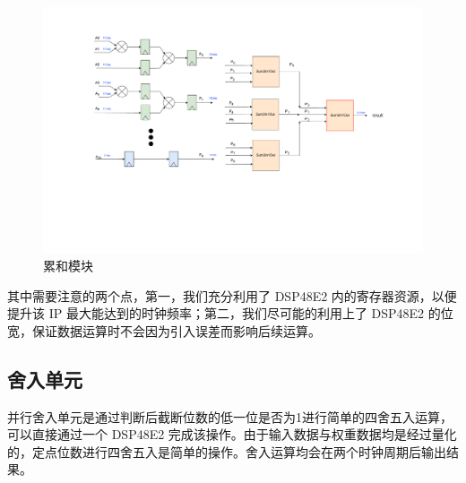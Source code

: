 \documentclass[12pt, a4paper, oneside]{ctexbook}
\begin{document}
		\begin{figure}[h]
		\centering
		\includegraphics[scale=0.52]{pic/sum}
		\caption{累和模块}
		\label{sum}
		\end{figure}
	其中需要注意的两个点，第一，我们充分利用了 DSP48E2 内的寄存器资源，以便提升该 IP 最大能达到的时钟频率；第二，我们尽可能的利用上了 DSP48E2 的位宽，保证数据运算时不会因为引入误差而影响后续运算。
	
	\subsection{舍入单元}
	并行舍入单元是通过判断后截断位数的低一位是否为1进行简单的四舍五入运算，可以直接通过一个 DSP48E2 完成该操作。由于输入数据与权重数据均是经过量化的，定点位数进行四舍五入是简单的操作。舍入运算均会在两个时钟周期后输出结果。
		
\end{document}

